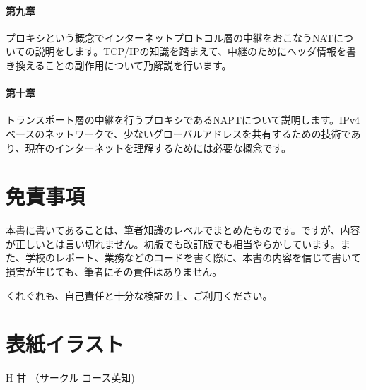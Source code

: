 \paragraph{第九章}
プロキシという概念でインターネットプロトコル層の中継をおこなうNATについての説明をします。TCP/IPの知識を踏まえて、中継のためにヘッダ情報を書き換えることの副作用について乃解説を行います。



\paragraph{第十章}
トランスポート層の中継を行うプロキシであるNAPTについて説明します。IPv4ベースのネットワークで、少ないグローバルアドレスを共有するための技術であり、現在のインターネットを理解するためには必要な概念です。


\section*{免責事項}
本書に書いてあることは、筆者知識のレベルでまとめたものです。ですが、内容が正しいとは言い切れません。初版でも改訂版でも相当やらかしています。また、学校のレポート、業務などのコードを書く際に、本書の内容を信じて書いて損害が生じても、筆者にその責任はありません。

くれぐれも、自己責任と十分な検証の上、ご利用ください。

\section*{表紙イラスト}
H-甘 （サークル コース英知)